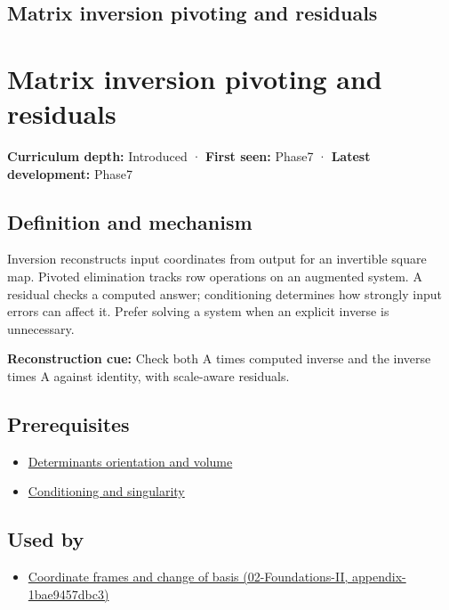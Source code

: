 \hypertarget{appendix-48d2e66378ab}{}
\section*{Matrix inversion pivoting and residuals}
\chapter{Matrix inversion pivoting and residuals}\label{appendix-48d2e66378ab-matrix-inversion-pivoting-and-residuals}

\textbf{Curriculum depth:} Introduced · \textbf{First seen:} Phase7 · \textbf{Latest development:} Phase7

\section{Definition and mechanism}\label{appendix-48d2e66378ab-definition-and-mechanism}

Inversion reconstructs input coordinates from output for an invertible square map. Pivoted elimination tracks row operations on an augmented system. A residual checks a computed answer; conditioning determines how strongly input errors can affect it. Prefer solving a system when an explicit inverse is unnecessary.

\textbf{Reconstruction cue:} Check both A times computed inverse and the inverse times A against identity, with scale-aware residuals.

\section{Prerequisites}\label{appendix-48d2e66378ab-prerequisites}

\begin{itemize}
\tightlist
\item
  \hyperref[appendix-da478be01d02]{Determinants orientation and volume}
\item
  \hyperref[appendix-8f6a01f284a7]{Conditioning and singularity}
\end{itemize}

\section{Used by}\label{appendix-48d2e66378ab-used-by}

\begin{itemize}
\tightlist
\item
  \href{../02-Foundations-II/main.pdf\#nameddest=appendix-1bae9457dbc3}{Coordinate frames and change of basis (02-Foundations-II, appendix-1bae9457dbc3)}
\end{itemize}

